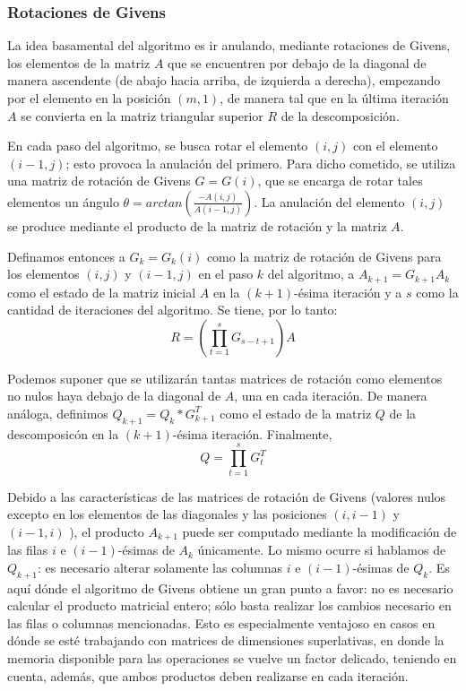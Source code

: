 \documentclass[journal, monochrome]{IEEEtran}
\begin{document}
\subsubsection{Rotaciones de Givens}
\par
La idea basamental del algoritmo es ir anulando, mediante rotaciones de Givens, los elementos de la matriz $A$ que se encuentren por debajo de la diagonal
de manera ascendente (de abajo hacia arriba, de izquierda a derecha), empezando por el elemento en la posición $(m,1)$, de manera
tal que en la última iteración $A$ se convierta en la matriz triangular superior $R$ de la descomposición.
\par
En cada paso del algoritmo, se busca rotar el elemento $(i,j)$ con el elemento $(i-1,j)$; esto provoca la anulación del primero.
Para dicho cometido, se utiliza una matriz de rotación de Givens $G = G(i)$, que se encarga de rotar tales elementos un
ángulo $\theta = arctan(\frac{-A(i,j)}{A(i-1,j)})$. La anulación del elemento $(i,j)$ se produce mediante el producto de la matriz de rotación y la matriz $A$.
\par
Definamos entonces a $G_k = G_k(i)$ como la matriz de rotación de Givens para los elementos $(i,j)$ y $(i-1,j)$ en el paso $k$ del algoritmo, a
$A_{k+1} = G_{k+1} A_k$ como el estado de la matriz inicial $A$ en la $(k+1)$-ésima iteración
y a $s$ como la cantidad de iteraciones del algoritmo. Se tiene, por lo tanto:
\begin{equation}
  R = (\displaystyle\prod_{t=1}^s G_{s-t+1}) A
\end{equation}

\par
Podemos suponer que se utilizarán tantas matrices de rotación como elementos no nulos haya debajo de la diagonal de $A$, una en cada iteración.
De manera análoga, definimos $Q_{k+1} = Q_k * G_{k+1}^T$ como el estado de la matriz $Q$ de la descomposicón en la $(k+1)$-ésima iteración. Finalmente,
\begin{equation}
Q = \displaystyle\prod_{t=1}^s G_{t}^T
\end{equation}

\par
Debido a las características de las matrices de rotación de Givens (valores nulos excepto en los elementos de las diagonales y las posiciones $(i, i-1)$ y $(i-1,i)$ ),
el producto $A_{k+1}$ puede ser computado mediante la modificación de las filas $i$ e $(i-1)$-ésimas de $A_k$ únicamente. Lo mismo ocurre si hablamos de $Q_{k+1}$: es necesario alterar
solamente las columnas $i$ e $(i-1)$-ésimas de $Q_{k}$. Es aquí dónde el algoritmo de Givens obtiene un gran punto a favor: no es necesario
calcular el producto matricial entero; sólo basta realizar los cambios necesario en las filas o columnas mencionadas. Esto es especialmente ventajoso
en casos en dónde se esté trabajando con matrices de dimensiones superlativas, en donde la memoria disponible para las operaciones se vuelve un factor delicado, teniendo
en cuenta, además, que ambos productos deben realizarse en cada iteración.
\end{document}
